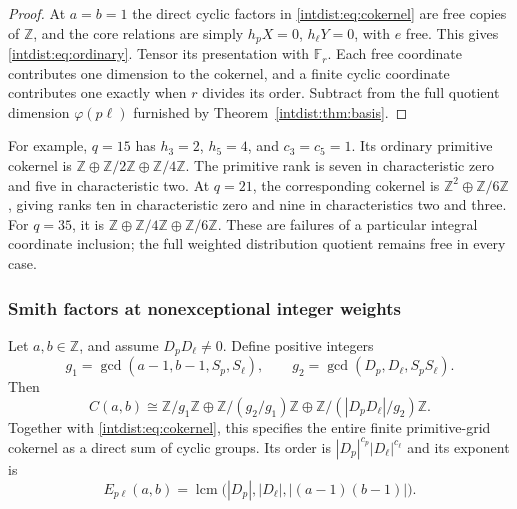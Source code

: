 \begin{proof}
At $a=b=1$ the direct cyclic factors in
\eqref{intdist:eq:cokernel} are free copies of $\mathbb Z$, and the
core relations are simply $h_pX=0$, $h_\ell Y=0$, with $e$ free.
This gives \eqref{intdist:eq:ordinary}. Tensor its presentation with
$\mathbb F_r$. Each free coordinate contributes one dimension to the
cokernel, and a finite cyclic coordinate contributes one exactly when
$r$ divides its order. Subtract from the full quotient dimension
$\varphi(p\ell)$ furnished by Theorem~\ref{intdist:thm:basis}.
\end{proof}

For example, $q=15$ has $h_3=2$, $h_5=4$, and $c_3=c_5=1$.
Its ordinary primitive cokernel is
$\mathbb Z\oplus\mathbb Z/2\mathbb Z\oplus\mathbb Z/4\mathbb Z$.
The primitive rank is seven in characteristic zero and five in
characteristic two. At $q=21$, the corresponding cokernel is
$\mathbb Z^2\oplus\mathbb Z/6\mathbb Z$, giving ranks ten in
characteristic zero and nine in characteristics two and three.
For $q=35$, it is
$\mathbb Z\oplus\mathbb Z/4\mathbb Z\oplus\mathbb Z/6\mathbb Z$.
These are failures of a particular integral coordinate inclusion; the
full weighted distribution quotient remains free in every case.

\subsubsection{Smith factors at nonexceptional integer weights}

\begin{corollary}
\label{intdist:cor:smith}
Let $a,b\in\mathbb Z$, and assume $D_pD_\ell\ne0$. Define positive
integers
\[
 g_1=\gcd(a-1,b-1,S_p,S_\ell),\qquad
 g_2=\gcd(D_p,D_\ell,S_pS_\ell).
\]
Then
\begin{equation}\label{intdist:eq:smith-core}
 C(a,b)\cong
 \mathbb Z/g_1\mathbb Z\oplus
 \mathbb Z/(g_2/g_1)\mathbb Z\oplus
 \mathbb Z/(|D_pD_\ell|/g_2)\mathbb Z.
\end{equation}
Together with \eqref{intdist:eq:cokernel}, this specifies the entire
finite primitive-grid cokernel as a direct sum of cyclic groups.
Its order is
$|D_p|^{c_p}|D_\ell|^{c_\ell}$ and its exponent is
\begin{equation}\label{intdist:eq:exponent}
 \boxed{\displaystyle
 E_{p\ell}(a,b)=
 \operatorname{lcm}\bigl(|D_p|,|D_\ell|,|(a-1)(b-1)|\bigr).}
\end{equation}
\end{corollary}

